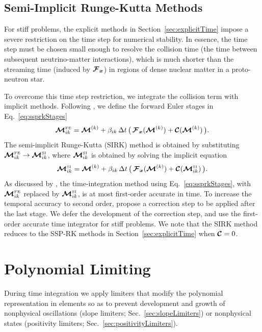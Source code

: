 \documentclass[10pt,preprint]{aastex}
\begin{document}
\subsection{Semi-Implicit Runge-Kutta Methods}
\label{sec:semiImplicitTime}

For stiff problems, the explicit methods in Section~\ref{sec:explicitTime} impose a severe restriction on the time step for numerical stability.  
In essence, the time step must be chosen small enough to resolve the collision time (the time between subsequent neutrino-matter interactions), which is much shorter than the streaming time (induced by $\boldsymbol{\mathcal{F}}_{\boldsymbol{x}}$) in regions of dense nuclear matter in a proto-neutron star.  

To overcome this time step restriction, we integrate the collision term with implicit methods.  
Following \citet{chertock_etal_2015}, we define the forward Euler stages in Eq.~\eqref{eq:ssprkStages}
\begin{equation}
  \boldsymbol{\mathcal{M}}_{ik}^{\mbox{\tiny FE}}
  =\boldsymbol{\mathcal{M}}^{(k)}+\beta_{ik}\,\Delta t\,\big(\,\boldsymbol{\mathcal{F}}_{\boldsymbol{x}}(\boldsymbol{\mathcal{M}}^{(k)})+\boldsymbol{\mathcal{C}}(\boldsymbol{\mathcal{M}}^{(k)})\,\big).  
\end{equation}
The semi-implicit Runge-Kutta (SIRK) method is obtained by substituting $\boldsymbol{\mathcal{M}}_{ik}^{\mbox{\tiny FE}}\to\boldsymbol{\mathcal{M}}_{ik}^{\mbox{\tiny SI}}$, where $\boldsymbol{\mathcal{M}}_{ik}^{\mbox{\tiny SI}}$ is obtained by solving the implicit equation
\begin{equation}
  \boldsymbol{\mathcal{M}}_{ik}^{\mbox{\tiny SI}}
  =\boldsymbol{\mathcal{M}}^{(k)}+\beta_{ik}\,\Delta t\,\big(\,\boldsymbol{\mathcal{F}}_{\boldsymbol{x}}(\boldsymbol{\mathcal{M}}^{(k)})+\boldsymbol{\mathcal{C}}(\boldsymbol{\mathcal{M}}_{ik}^{\mbox{\tiny SI}})\,\big).  
\end{equation}
As discussed by \citet{chertock_etal_2015}, the time-integration method using Eq.~\eqref{eq:ssprkStages}, with $\boldsymbol{\mathcal{M}}_{ik}^{\mbox{\tiny FE}}$ replaced by $\boldsymbol{\mathcal{M}}_{ik}^{\mbox{\tiny SI}}$, is at most first-order accurate in time.  
To increase the temporal accuracy to second order, \citet{chertock_etal_2015} propose a correction step to be applied after the last stage.  
We defer the development of the correction step, and use the first-order accurate time integrator for stiff problems.  
We note that the SIRK method reduces to the SSP-RK methods in Section~\ref{sec:explicitTime} when $\boldsymbol{\mathcal{C}}=0$.  

\section{Polynomial Limiting}

During time integration we apply limiters that modify the polynomial representation in elements so as to prevent development and growth of nonphysical oscillations (slope limiters; Sec.~\ref{sec:slopeLimiters}) or nonphysical states (positivity limiters; Sec.~\ref{sec:positivityLimiters}).  
\end{document}
